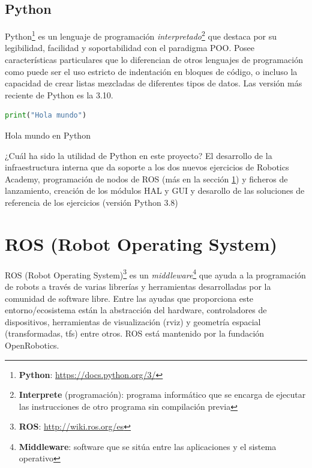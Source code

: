 \subsection{Python}
\label{subsec:python}

Python\footnote{\textbf{Python}: \url{https://docs.python.org/3/}} es un lenguaje de programación \textit{interpretado}\footnote{\textbf{Interprete} (programación): programa informático que se encarga de ejecutar las instrucciones de otro programa sin compilación previa} que destaca por su legibilidad, facilidad y soportabilidad con el paradigma POO. Posee características particulares que lo diferencian de otros lenguajes de programación como puede ser el uso estricto de indentación en bloques de código, o incluso la capacidad de crear listas mezcladas de diferentes tipos de datos. Las versión más reciente de Python es la 3.10.\\

\begin{code}[H]
\begin{lstlisting}[language=Python]
print("Hola mundo")
\end{lstlisting}
\caption[Hola mundo en Python]{Hola mundo en Python}
\label{cod:holamundo_python}
\end{code}

¿Cuál ha sido la utilidad de Python en este proyecto? El desarrollo de la infraestructura interna que da soporte a los dos nuevos ejercicios de Robotics Academy, programación de nodos de ROS (más en la sección \ref{sec:ros}) y ficheros de lanzamiento, creación de los módulos HAL y GUI y desarollo de las soluciones de referencia de los ejercicios (versión Python 3.8)\\




\section{ROS (Robot Operating System)}
\label{sec:ros}
ROS (Robot Operating System)\footnote{\textbf{ROS}: \url{http://wiki.ros.org/es}} es un \textit{middleware}\footnote{\textbf{Middleware}: software que se sitúa entre las aplicaciones y el sistema operativo} que ayuda a la programación de robots a través de varias librerías y herramientas desarrolladas por la comunidad de software libre. Entre las ayudas que proporciona este entorno/ecosistema están la abstracción del hardware, controladores de dispositivos, herramientas de visualización (rviz) y geometría espacial (transformadas, tfs) entre otros. ROS está mantenido por la fundación OpenRobotics.\\

